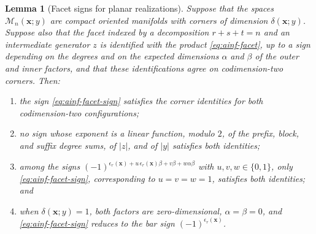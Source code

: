 \documentclass[11pt,letterpaper,twoside]{article}
\theoremstyle{plain}
\newtheorem{lemma}[theorem]{Lemma}
\theoremstyle{definition}
\theoremstyle{remark}
\begin{document}
\begin{lemma}[Facet signs for planar realizations]\label{lem:ainf-sign}
Suppose that the spaces \(\mathcal M_n(\mathbf x;y)\) are compact oriented manifolds with corners of dimension \(\delta(\mathbf x;y)\).  Suppose also that the facet indexed by a decomposition \(r+s+t=n\) and an intermediate generator \(z\) is identified with the product \eqref{eq:ainf-facet}, up to a sign depending on the degrees and on the expected dimensions \(\alpha\) and \(\beta\) of the outer and inner factors, and that these identifications agree on codimension-two corners.  Then:
\begin{enumerate}
\item the sign \eqref{eq:ainf-facet-sign} satisfies the corner identities for both codimension-two configurations;
\item no sign whose exponent is a linear function, modulo \(2\), of the prefix, block, and suffix degree sums, of \(|z|\), and of \(|y|\) satisfies both identities;
\item among the signs \((-1)^{\epsilon_r(\mathbf x)+u\,\epsilon_r(\mathbf x)\beta+v\beta+w\alpha\beta}\) with \(u,v,w\in\{0,1\}\), only \eqref{eq:ainf-facet-sign}, corresponding to \(u=v=w=1\), satisfies both identities; and
\item when \(\delta(\mathbf x;y)=1\), both factors are zero-dimensional, \(\alpha=\beta=0\), and \eqref{eq:ainf-facet-sign} reduces to the bar sign \((-1)^{\epsilon_r(\mathbf x)}\).
\end{enumerate}
\end{lemma}
\end{document}
